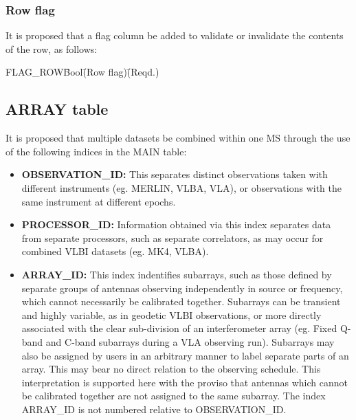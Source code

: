 \documentclass{article}
\begin{document}
\subsubsection{Row flag}

It is proposed that a flag column be added to validate or invalidate
the contents of the row, as follows:

\begin{tabbing}
FLAG\_ROW\quad\quad \= Bool\quad\quad \= (Row flag)\quad\quad \= (Reqd.)\\
\end{tabbing}

\subsection{ARRAY table}

It is proposed that multiple datasets be combined within one MS
through the use of the following indices in the MAIN table:

\begin{itemize}

\item{{\bf OBSERVATION\_ID:} This separates distinct observations
taken with different instruments (eg. MERLIN, VLBA, VLA), or observations
with the same instrument at different epochs.}

\item{{\bf PROCESSOR\_ID:} Information obtained via this index
separates data from separate processors, such as separate correlators,
as may occur for combined VLBI datasets (eg. MK4, VLBA).}

\item{{\bf ARRAY\_ID:} This index indentifies subarrays, such as those
defined by separate groups of antennas observing independently in
source or frequency, which cannot necessarily be calibrated
together. Subarrays can be transient and highly variable, as in
geodetic VLBI observations, or more directly associated with the clear
sub-division of an interferometer array (eg. Fixed Q-band and C-band
subarrays during a VLA observing run). Subarrays may also be assigned
by users in an arbitrary manner to label separate parts of an
array. This may bear no direct relation to the observing
schedule. This interpretation is supported here with the proviso that
antennas which cannot be calibrated together are not assigned to the
same subarray. The index ARRAY\_ID is not numbered relative to
OBSERVATION\_ID.}

\end{itemize}
\end{document}
